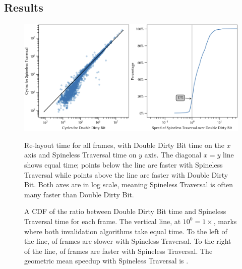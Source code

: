 \subsection{Results}

\begin{figure}
\includegraphics[scale=0.4]{DBPQ.png}
\begin{minipage}[t]{0.48\linewidth}
\caption{
Re-layout time for all \NumFrames frames,
    with Double Dirty Bit time on the $x$ axis
    and Spineless Traversal time on $y$ axis.
The diagonal $x = y$ line shows equal time;
    points below the line are faster with Spineless Traversal
    while points above the line are faster with Double Dirty Bit.
Both axes are in log scale, meaning Spineless Traversal is often
    many faster than Double Dirty Bit.
}
\label{fig:xy}
\end{minipage}\hfill%
\begin{minipage}[t]{0.48\linewidth}
\caption{
  A CDF of the ratio between
    Double Dirty Bit time and Spineless Traversal time
    for each frame.
  The vertical line, at $10^0 = 1\times$,
    marks where both invalidation algorithms take equal time.
  To the left of the line,
    \PctSlower of frames are slower with Spineless Traversal.
  To the right of the line,
    \PctFaster of frames are faster with Spineless Traversal.
  The geometric mean speedup with Spineless Traversal
    is \MeanSpeedup.}
\label{fig:cdf}
\end{minipage}
\end{figure}

